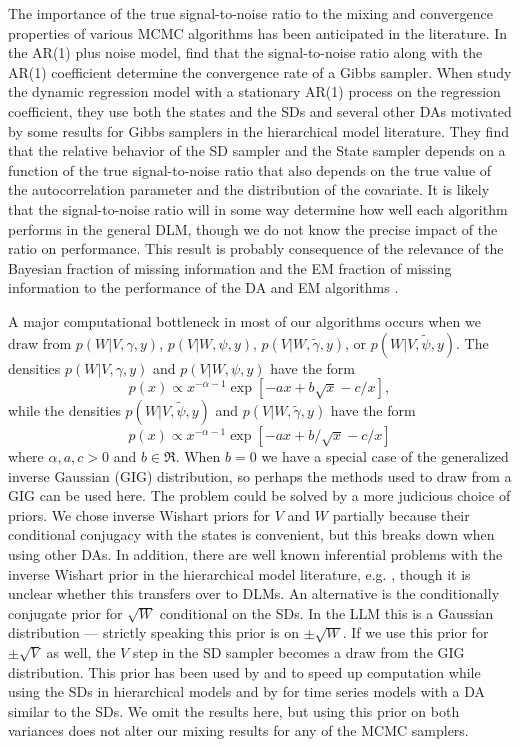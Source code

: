 \documentclass[12pt]{article}
\begin{document}
The importance of the true signal-to-noise ratio to the mixing and convergence properties of various MCMC algorithms has been anticipated in the literature. In the AR(1) plus noise model, \citet{pitt1999analytic} find that the signal-to-noise ratio along with the AR(1) coefficient determine the convergence rate of a Gibbs sampler. When \citet{fruhwirth2004efficient} study the dynamic regression model with a stationary AR(1) process on the regression coefficient, they use both the states and the SDs and several other DAs motivated by some results for Gibbs samplers in the hierarchical model literature. They find that the relative behavior of the SD sampler and the State sampler depends on a function of the true signal-to-noise ratio that also depends on the true value of the autocorrelation parameter and the distribution of the covariate. It is likely that the signal-to-noise ratio will in some way determine how well each algorithm performs in the general DLM, though we do not know the precise impact of the ratio on performance. This result is probably consequence of the relevance of the Bayesian fraction of missing information and the EM fraction of missing information to the performance of the DA and EM algorithms \citep{van2001art}.

A major computational bottleneck in most of our algorithms occurs when we draw from $p(W|V,\gamma,y)$, $p(V|W,\psi,y)$, $p(V|W,\tilde{\gamma},y)$, or $p(W|V,\tilde{\psi},y)$. The densities $p(W|V,\gamma,y)$ and $p(V|W,\psi,y)$ have the form
\[
p(x)\propto x^{-\alpha-1}\exp\left[-ax + b\sqrt{x} - c/x\right],
\]
while the densities $p(W|V,\tilde{\psi},y)$ and $p(V|W,\tilde{\gamma},y)$ have the form
\[
p(x)\propto x^{-\alpha-1}\exp\left[ -ax + b/\sqrt{x} -c/x\right]
\]
where $\alpha,a,c>0$ and $b\in\Re$. When $b=0$ we have a special case of the generalized inverse Gaussian (GIG) distribution, so perhaps the methods used to draw from a GIG can be used here. The problem could be solved by a more judicious choice of priors. We chose inverse Wishart priors for $V$ and $W$ partially because their conditional conjugacy with the states is convenient, but this breaks down when using other DAs. In addition, there are well known inferential problems with the inverse Wishart prior in the hierarchical model literature, e.g. \citet{gelman2006prior} 
, though it is unclear whether this transfers over to DLMs. An alternative is the conditionally conjugate prior for $\sqrt{W}$ conditional on the SDs. In the LLM this is a Gaussian distribution --- strictly speaking this prior is on $\pm \sqrt{W}$. If we use this prior for $\pm\sqrt{V}$ as well, the $V$ step in the SD sampler becomes a draw from the GIG distribution. This prior has been used by \citet{fruhwirth2011bayesian} and \citet{fruhwirth2008bayesian} to speed up computation while using the SDs in hierarchical models and by \citet{fruhwirth2010stochastic} for time series models with a DA similar to the SDs. We omit the results here, but using this prior on both variances does not alter our mixing results for any of the MCMC samplers.
\end{document}
